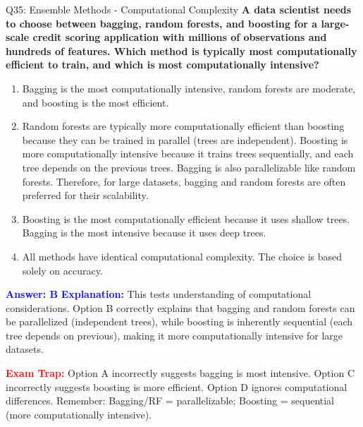 \documentclass[8pt]{beamer}
\begin{document}
	\begin{frame}{Q35: Ensemble Methods - Computational Complexity}
		\fontsize{6.5}{7.5}\selectfont
		\textbf{A data scientist needs to choose between bagging, random forests, and boosting for a large-scale credit scoring application with millions of observations and hundreds of features. Which method is typically most computationally efficient to train, and which is most computationally intensive?}
		
		\begin{enumerate}
			\item Bagging is the most computationally intensive, random forests are moderate, and boosting is the most efficient.
			\item Random forests are typically more computationally efficient than boosting because they can be trained in parallel (trees are independent). Boosting is more computationally intensive because it trains trees sequentially, and each tree depends on the previous trees. Bagging is also parallelizable like random forests. Therefore, for large datasets, bagging and random forests are often preferred for their scalability.
			\item Boosting is the most computationally efficient because it uses shallow trees. Bagging is the most intensive because it uses deep trees.
			\item All methods have identical computational complexity. The choice is based solely on accuracy.
		\end{enumerate}
		
		\vspace{0.1cm}
		\textcolor{blue}{\textbf{Answer: B}}
		\vspace{0.1cm}
		\textcolor{blue}{\textbf{Explanation:}} This tests understanding of computational considerations. Option B correctly explains that bagging and random forests can be parallelized (independent trees), while boosting is inherently sequential (each tree depends on previous), making it more computationally intensive for large datasets.
		
		\textcolor{red}{\textbf{Exam Trap:}} Option A incorrectly suggests bagging is most intensive. Option C incorrectly suggests boosting is more efficient. Option D ignores computational differences. Remember: Bagging/RF = parallelizable; Boosting = sequential (more computationally intensive).
	\end{frame}
	
\end{document}
